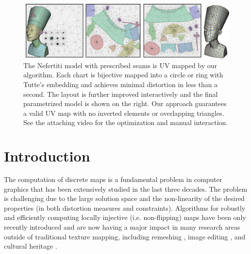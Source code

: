 \begin{figure}
  \center
 \includegraphics[width=\textwidth]{scaf-tex/figs/teaser}
 \caption{The Nefertiti model with prescribed seams is UV mapped by our algorithm. Each chart is bijective mapped into a circle or ring with Tutte's embedding and achieves minimal distortion in less than a second. The layout is further improved interactively and the final parametrized model is shown on the right. Our approach guarantees a valid UV map with no inverted elements or overlapping triangles. See the attaching video for the optimization and manual interaction.
}
 \label{scaf:fig:teaser}
\end{figure}

\section{Introduction}

The computation of discrete maps is a fundamental problem in computer graphics that has been extensively studied in the last three decades. The problem is challenging due to the large solution space
and the non-linearity of the desired properties ({in both} distortion measures and constraints). Algorithms for robustly and efficiently computing locally injective (i.e. non-flipping) maps have been only recently introduced \cite{Lipman:2012,Kovalsky:2016,rabinovich2017scalable} and are now having a major impact in many research areas outside of traditional texture mapping, including remeshing \cite{Bommes:2013}, image editing \cite{Poranne:2014}, and cultural heritage \cite{Pal:2014}.

